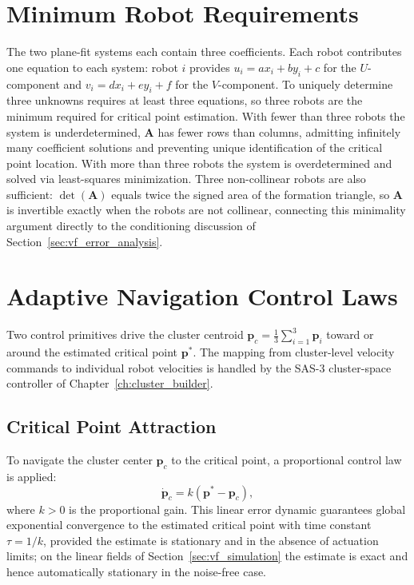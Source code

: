 \documentclass[12pt, letterpaper, oneside]{report}
\begin{document}
\section{Minimum Robot Requirements}
\label{sec:vf_minimality}

The two plane-fit systems each contain three coefficients. Each robot
contributes one equation to each system: robot $i$ provides
$u_i=ax_i+by_i+c$ for the $U$-component and $v_i=dx_i+ey_i+f$ for the
$V$-component. To uniquely determine three unknowns requires at least three
equations, so three robots are the minimum required for critical point
estimation. With fewer than three robots the system is underdetermined,
$\mathbf{A}$ has fewer rows than columns, admitting infinitely many
coefficient solutions and preventing unique identification of the critical
point location. With more than three robots the system is overdetermined
and solved via least-squares minimization. Three non-collinear robots are
also sufficient: $\det(\mathbf{A})$ equals twice the signed area of the
formation triangle, so $\mathbf{A}$ is invertible exactly when the robots
are not collinear, connecting this minimality argument directly to the
conditioning discussion of Section~\ref{sec:vf_error_analysis}.

\section{Adaptive Navigation Control Laws}
\label{sec:control_primitives}

Two control primitives drive the cluster centroid
$\mathbf{p}_c=\tfrac13\sum_{i=1}^3\mathbf{p}_i$ toward or around the
estimated critical point $\mathbf{p}^*$. The mapping from cluster-level
velocity commands to individual robot velocities is handled by the SAS-3
cluster-space controller of Chapter~\ref{ch:cluster_builder}.

\subsection{Critical Point Attraction}

To navigate the cluster center $\mathbf{p}_c$ to the critical point, a
proportional control law is applied:
\begin{equation}
\dot{\mathbf{p}}_c = k(\mathbf{p}^*-\mathbf{p}_c),
\label{eq:vf_attraction}
\end{equation}
where $k>0$ is the proportional gain. This linear error dynamic guarantees
global exponential convergence to the estimated critical point with time
constant $\tau=1/k$, provided the estimate is stationary and in the absence
of actuation limits; on the linear fields of Section~\ref{sec:vf_simulation}
the estimate is exact and hence automatically stationary in the noise-free
case.
\end{document}
